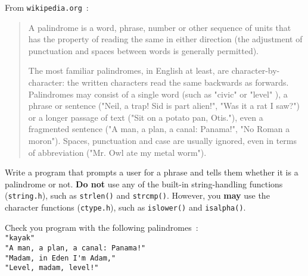 
From \verb^wikipedia.org^~:

\begin{quote}
A palindrome is a word, phrase, number or other sequence of units that has the property of reading the same in either direction (the adjustment of punctuation and spaces between words is generally permitted).

The most familiar palindromes, in English at least, are character-by-character: the written characters read the same backwards as forwards. Palindromes may consist of a single word (such as "civic" or "level" ), a phrase or sentence ("Neil, a trap! Sid is part alien!", "Was it a rat I saw?") or a longer passage of text ("Sit on a potato pan, Otis."), even a fragmented sentence ("A man, a plan, a canal: Panama!", "No Roman a moron"). Spaces, punctuation and case are usually ignored, even in terms of abbreviation ("Mr. Owl ate my metal worm").
\end{quote}

\begin{exercise}
Write a program that prompts a user for a phrase and tells them whether 
it is a palindrome or not.  {\bf Do not} use any of the built-in
string-handling functions (\verb^string.h^), such as
\verb^strlen()^ and \verb^strcmp()^.
However, you {\bf may} use the character functions (\verb^ctype.h^), such as
\verb^islower()^ and \verb^isalpha()^.

Check you program with the following palindromes~:
\\
\verb^"kayak"^\\
\verb^"A man, a plan, a canal: Panama!"^\\
\verb^"Madam, in Eden I'm Adam,"^\\
\verb^"Level, madam, level!"^
\end{exercise}
